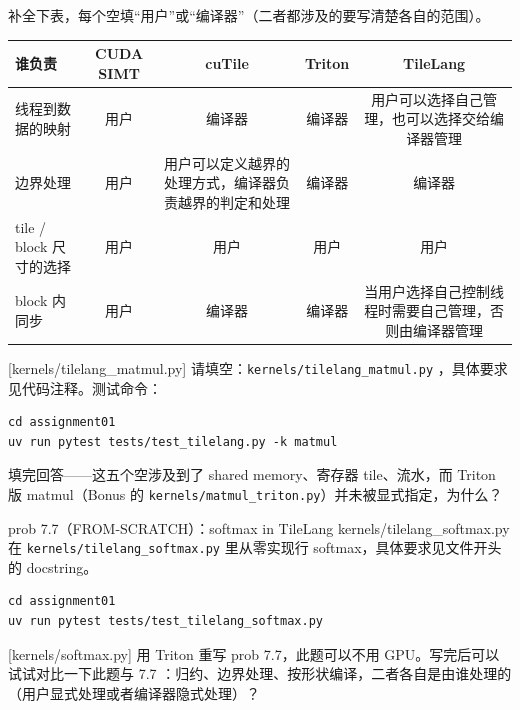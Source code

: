 \documentclass[11pt,a4paper,fontset=none]{ctexart}
\begin{document}
补全下表，每个空填“用户”或“编译器”（二者都涉及的要写清楚各自的范围）。

\begin{center}\small
\begin{tabular}{@{}lcccc@{}}
\toprule
谁负责 & CUDA SIMT & cuTile & Triton & TileLang \\
\midrule
线程到数据的映射 & 用户 & 编译器 & 编译器 & 用户可以选择自己管理，也可以选择交给编译器管理 \\
边界处理 & 用户 & 用户可以定义越界的处理方式，编译器负责越界的判定和处理& 编译器 & 编译器 \\
tile / block 尺寸的选择 & 用户 & 用户 & 用户 & 用户\\
block 内同步 & 用户 & 编译器 & 编译器 & 当用户选择自己控制线程时需要自己管理，否则由编译器管理 \\
\bottomrule
\end{tabular}
\end{center}

[kernels/tilelang\_matmul.py]
请填空：\texttt{kernels/tilelang\_matmul.py} ，具体要求见代码注释。测试命令：

\begin{lstlisting}
cd assignment01
uv run pytest tests/test_tilelang.py -k matmul
\end{lstlisting}

填完回答——这五个空涉及到了 shared memory、寄存器 tile、流水，而 Triton 版 matmul（Bonus 的 \texttt{kernels/matmul\_triton.py}）并未被显式指定，为什么？


\begin{capstone}{prob 7.7（FROM-SCRATCH）：softmax in TileLang \hfill {\footnotesize\ttfamily kernels/tilelang\_softmax.py}}
在 \texttt{kernels/tilelang\_softmax.py} 里从零实现行 softmax，具体要求见文件开头的 docstring。
\end{capstone}

\begin{lstlisting}
cd assignment01
uv run pytest tests/test_tilelang_softmax.py
\end{lstlisting}

[kernels/softmax.py]
用 Triton 重写 prob 7.7，此题可以不用 GPU。写完后可以试试对比一下此题与 7.7 ：归约、边界处理、按形状编译，二者各自是由谁处理的（用户显式处理或者编译器隐式处理）？
\end{document}
